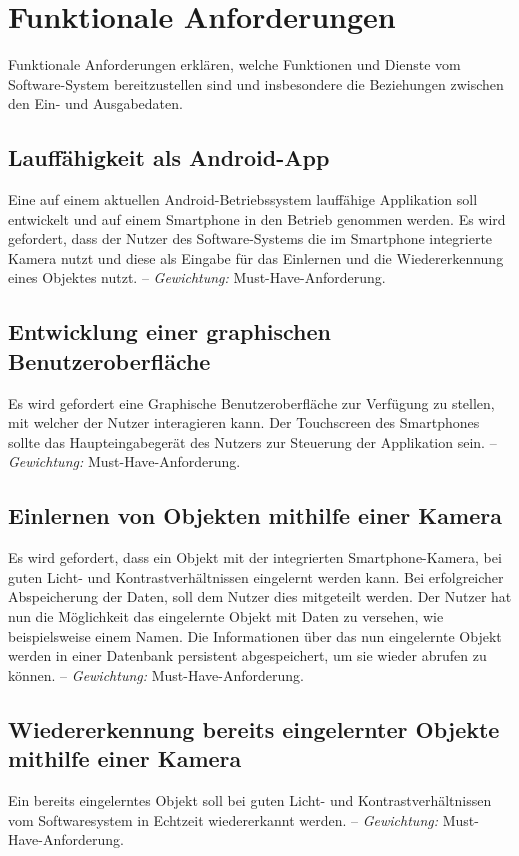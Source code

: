 \documentclass[oneside]{ausarbeitung}
\begin{document}
\section{Funktionale Anforderungen}
Funktionale Anforderungen erklären, welche Funktionen und Dienste vom Software-System bereitzustellen sind und insbesondere die Beziehungen zwischen den Ein- und Ausgabedaten.

\subsection{Lauffähigkeit als Android-App}
Eine auf einem aktuellen Android-Betriebssystem lauffähige Applikation soll entwickelt und auf einem Smartphone in den Betrieb genommen werden. Es wird gefordert, dass der Nutzer des Software-Systems die im Smartphone integrierte Kamera nutzt und diese als Eingabe für das Einlernen und die Wiedererkennung eines Objektes nutzt.  -- \textit{Gewichtung:} Must-Have-Anforderung.
\subsection{Entwicklung einer graphischen Benutzeroberfläche}
Es wird gefordert eine Graphische Benutzeroberfläche zur Verfügung zu stellen, mit welcher der Nutzer interagieren kann. Der Touchscreen des Smartphones sollte das Haupteingabegerät des Nutzers zur Steuerung der Applikation sein. -- \textit{Gewichtung:} Must-Have-Anforderung.
\subsection{Einlernen von Objekten mithilfe einer Kamera}
Es wird gefordert, dass ein Objekt mit der integrierten Smartphone-Kamera, bei guten Licht- und Kontrastverhältnissen eingelernt werden kann. Bei erfolgreicher Abspeicherung der Daten, soll dem Nutzer dies mitgeteilt werden. Der Nutzer hat nun die Möglichkeit das eingelernte Objekt mit Daten zu versehen, wie beispielsweise einem Namen. Die Informationen über das nun eingelernte Objekt werden in einer Datenbank persistent abgespeichert, um sie wieder abrufen zu können. -- \textit{Gewichtung:} Must-Have-Anforderung.

\subsection{Wiedererkennung bereits eingelernter Objekte mithilfe einer Kamera}
Ein bereits eingelerntes Objekt soll bei guten Licht- und Kontrastverhältnissen vom Softwaresystem in Echtzeit wiedererkannt werden. -- \textit{Gewichtung:} Must-Have-Anforderung.
\end{document}
